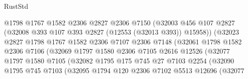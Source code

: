 \begin{lexlean}{RustStd}
\begin{coremodule}
                                  @1798
                                  @1767
                                  @1582
                                  @2306
                                  @2827
                                  @2306
                                  @7150
                                  (@32003
                                    @456
                                    @107
                                    @2827
                                    (@32008 @393 @107 @393 @2827 (@12553 (@32013 @393)) @15958))
                                  (@32023
                                    @2827
                                    @1798
                                    @1767
                                    @1582
                                    @2306
                                    @7107
                                    @2306
                                    @7148
                                    (@32061
                                      @1798
                                      @1582
                                      @2306
                                      @7106
                                      (@32069
                                        @1797
                                        @1580
                                        @2306
                                        @7105
                                        @2616
                                        @12526
                                        (@32077
                                          @1797
                                          @1580
                                          @7105
                                          (@32082
                                            @1795
                                            @175
                                            @745
                                            @27
                                            @7103
                                            @2254
                                            (@32090
                                              @1795
                                              @745
                                              @7103
                                              (@32095
                                                @1794
                                                @120
                                                @2306
                                                @7102
                                                @5513
                                                @12696
                                                (@32077

\end{coremodule}
\end{lexlean}
